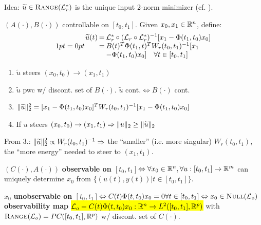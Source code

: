 \begin{minipage}{0.8\columnwidth}
Idea: $\widetilde u\in\textsc{Range}(\mathcal L_r^*)$ is the unique input 2-norm minimizer (cf. \hyperlink{min_theorem7_3}{\textbf{}}).
\begin{Theorem}
$(A(\cdot),B(\cdot))$ controllable on $[t_0,t_1]$. Given $x_0,x_1\in\mathbb R^n$, define:
\begin{equation*}
\arraycolsep=0pt
\begin{array}{rcl}
\widetilde u(t) & = & 
\mathcal L_r^*\circ(\mathcal L_r\circ\mathcal L_r^*)^{-1}[x_1-\Phi(t_1,t_0)x_0] \\
& = & B(t)^T\Phi(t_1,t)^TW_r(t_0,t_1)^{-1}[x_1 \\
& & -\Phi(t_1,t_0)x_0]\quad\forall t\in[t_0,t_1]
\end{array}
\end{equation*}
\begin{enumerate}[leftmargin=4mm]
  \item $\widetilde u$ steers $(x_0,t_0)\to (x_1,t_1)$
  \item $\widetilde u$ pwc w/ discont. set of $B(\cdot)$. $\widetilde u$ cont.$\Leftrightarrow B(\cdot)$ cont.
  \item $\|\widetilde u\|_{2}^2=[x_1-\Phi(t_1,t_0)x_0]^T W_r(t_0,t_1)^{-1}[x_1-\Phi(t_1,t_0)x_0]$
  \item If $u$ steers $(x_0,t_0)\to (x_1,t_1)\Rightarrow\|u\|_{2}\ge\|\widetilde u\|_{2}$
\end{enumerate}
\end{Theorem}
\end{minipage}
\begin{Fact}
From 3.: $\|\widetilde u\|_{2}^2\propto W_r(t_0,t_1)^{-1}\Rightarrow$ the ``smaller'' (i.e. more singular) $W_r(t_0,t_1)$, the ``more energy'' needed to steer to $(x_1,t_1)$.
\end{Fact}
\begin{Definition}
$(C(\cdot),A(\cdot))$ \textbf{observable on $[t_0,t_1]$}$\Leftrightarrow\forall x_0\in\mathbb R^n,\forall u:[t_0,t_1]\to\mathbb R^m$ can uniquely determine $x_0$ from $\{(u(t),y(t))|t\in [t_0,t_1]\}$.
\end{Definition}
\begin{Definition}
$x_0$ \textbf{unobservable on $[t_0,t_1]$}$\Leftrightarrow C(t)\Phi(t,t_0)x_0=0\forall t\in[t_0,t_1]\Leftrightarrow x_0\in\textsc{Null}(\mathcal L_o)$ \textbf{observability map} \hl{$\mathcal L_o=C(t)\Phi(t,t_0)x_0:\mathbb R^n\to L^2([t_0,t_1],\mathbb R^p)$} with $\textsc{Range}(\mathcal L_o)=PC([t_0,t_1],\mathbb R^p)$ w/ discont. set of $C(\cdot)$.
\end{Definition}
